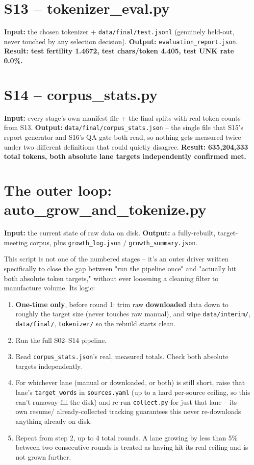 \documentclass[11pt]{report}
\begin{document}
\section{S13 -- tokenizer\_eval.py}

\textbf{Input:} the chosen tokenizer + \texttt{data/final/test.jsonl}
(genuinely held-out, never touched by any selection decision).
\textbf{Output:} \texttt{evaluation\_report.json}. \textbf{Result: test
fertility 1.4672, test chars/token 4.405, test UNK rate 0.0\%.}

\section{S14 -- corpus\_stats.py}

\textbf{Input:} every stage's own manifest file + the final splits with
real token counts from S13. \textbf{Output:}
\texttt{data/final/corpus\_stats.json} -- the single file that S15's
report generator and S16's QA gate both read, so nothing gets measured
twice under two different definitions that could quietly disagree.
\textbf{Result: 635,204,333 total tokens, both absolute lane targets
independently confirmed met.}

\section{The outer loop: auto\_grow\_and\_tokenize.py}

\textbf{Input:} the current state of raw data on disk.
\textbf{Output:} a fully-rebuilt, target-meeting corpus, plus
\texttt{growth\_log.json} / \texttt{growth\_summary.json}.

This script is not one of the numbered stages -- it's an outer driver
written specifically to close the gap between "run the pipeline once" and
"actually hit both absolute token targets," without ever loosening a
cleaning filter to manufacture volume. Its logic:

\begin{enumerate}
\item \textbf{One-time only}, before round 1: trim raw \textbf{downloaded}
data down to roughly the target size (never touches raw manual), and wipe
\texttt{data/interim/}, \texttt{data/final/}, \texttt{tokenizer/} so the
rebuild starts clean.
\item Run the full S02--S14 pipeline.
\item Read \texttt{corpus\_stats.json}'s real, measured totals. Check
both absolute targets independently.
\item For whichever lane (manual or downloaded, or both) is still short,
raise that lane's \texttt{target\_words} in \texttt{sources.yaml} (up to
a hard per-source ceiling, so this can't runaway-fill the disk) and
re-run \texttt{collect.py} for just that lane -- its own resume/
already-collected tracking guarantees this never re-downloads anything
already on disk.
\item Repeat from step 2, up to 4 total rounds. A lane growing by less
than 5\% between two consecutive rounds is treated as having hit its real
ceiling and is not grown further.
\end{enumerate}
\end{document}
